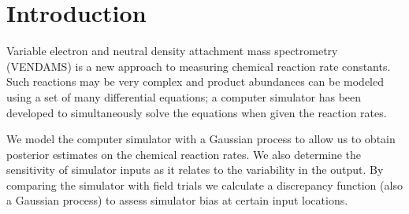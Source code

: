 \section{Introduction}

Variable electron and neutral density attachment mass spectrometry (VENDAMS) is a new approach to measuring chemical reaction rate constants. Such reactions may be very complex and product abundances can be modeled using a set of many differential equations; a computer simulator has been developed to simultaneously solve the equations when given the reaction rates. 

We model the computer simulator with a Gaussian process to allow us to obtain posterior estimates on the chemical reaction rates. We also determine the sensitivity of simulator inputs as it relates to the variability in the output. By comparing the simulator with field trials we calculate a discrepancy function (also a Gaussian process) to assess simulator bias at certain input locations.
